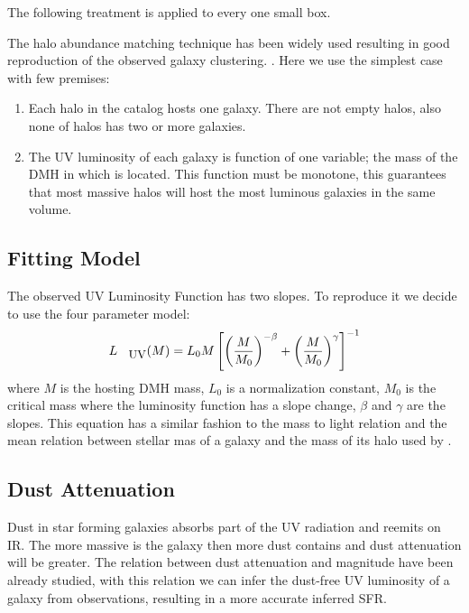 \documentclass{emulateapj}
\begin{document}
The following treatment is applied to every one small box.

The halo abundance matching technique has been widely used \citep{colin99, kravtsov04}
resulting in good reproduction of the observed galaxy clustering. \citep{conroy06, lee09}. 
Here we use the simplest case with few premises: 
\begin{enumerate}
 \item Each halo in the catalog hosts one galaxy. There are not empty
halos, also none of halos has two or more galaxies.
 \item The UV luminosity of each galaxy is function of one variable; the mass of
the DMH in which is located. This function must be monotone, this guarantees that most 
massive halos will host the most luminous galaxies in the same volume.
\end{enumerate}

\subsection{Fitting Model}

The observed UV Luminosity Function has two slopes. To reproduce it we decide to use the
 four parameter model:
  \begin{equation}\label{eqn:luminosity}
  L_{\textrm{\small{UV}}} (M) = L_{0} M \left[ \left( \frac{M}{M_0}\right)^{-\beta} 
		   + \left( \frac{M}{M_0}\right)^{\gamma} 
               \right]^{-1}
  \end{equation}
where $M$ is the hosting DMH mass, $L_{0}$ is a normalization constant, $M_0$
is the critical mass where the luminosity function has a slope change, 
$\beta$ and $\gamma$ are the slopes. This equation has a similar fashion to the
mass to light relation \citep{vandenbosch03} and the mean relation between
stellar mas of a galaxy and the mass of its halo used by \citet{moster10}.


\subsection{Dust Attenuation}
 
Dust in star forming galaxies absorbs part of the UV radiation and reemits on IR. The more 
massive is the galaxy then more dust contains and dust attenuation will be greater. The 
relation between dust attenuation and magnitude have been already studied, with this relation 
we can infer the dust-free UV luminosity of a galaxy from observations, resulting in  a more 
accurate inferred SFR.
\end{document}
